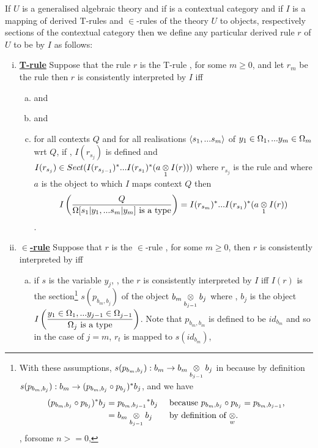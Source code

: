 \begin{definition}
If $U$ is a generalised algebraic theory and if \catcw is a contextual category 
and if $I$ is a  mapping of derived T-rules and $\in$-rules of the theory $U$ to objects, respectively sections of the contextual category \catcw
then we define any particular derived rule $r$ of $U$ to be  by $I$ as follows: \\
\begin{enumerate}[(i)]
\item \underline{\textbf{T-rule}} 
Suppose that  the rule $r$ is the T-rule \ZOmega, for some $m \geq 0$, and let $r_m$ be the rule 
then $r$ is consistently interpreted by $I$ iff
\begin{enumerate}[(a)] 
\item {} and 
\item {} and
\item
for all contexts $Q$ and for all realisations $\tuple{\sm}$ of $\yOmega{m}$ wrt $Q$, 
if \foreachj, $I(r_{s_j})$ is defined 
and $I(r_{s_j}) \in Sect(I(r_{s_{j-1}})^*...I(r_{s_1})^*(\crossx{a}{I(r)}{1}))$
where $r_{s_j}$ is the rule  
and where $a$ is the object to which $I$ maps context $Q$ 
then
$$ \Imappedrule{Q}{\isT{\Omega[\SUBsFORy{m}]}} 
= I(r_{s_m})^*...I(r_{s_1})^*(\crossx{a}{I(r)}{1})$$
. 
\end {enumerate}
\item \underline{\textbf{$\boldsymbol {\in}$-rule}} 
Suppose that $r$ is the $\in$-rule \ZsOmega, for some $m \geq 0$, then
$r$ is consistently interpreted by iff
\begin{enumerate}[(a)]
\item if $s$ is the variable $y_j$, \forsomej, the $r$ is consistently interpreted
by $I$ iff $I(r)$ is the section\footnote{
With these assumptions, $s(p_{b_m,b_j}): b_m \morph \crossx{b_m}{b_j}{b_{j-1}}$ in \catcw because by definition  $s(p_{b_m,b_j}): b_m  \morph (p_{b_m,b_j} \circ p_{b_j})^*b_j$,
and we have 
\begin{align*}
(p_{b_m,b_j} \circ p_{b_j})^*b_j &= {p_{b_m,b_{j-1}}} ^* b_j  && \mbox{ because $p_{b_m,b_j} \circ p_{b_j}=p_{b_m,b_{j-1}}$,} \\
                                 &= \crossx{b_m}{b_j}{b_{j-1}} && \mbox{ by definition of $\crossx{}{}{w}$}.
\end{align*}
, forsome $n >=0$,} %
$s(p_{b_m,b_j})$ of the object $\crossx{b_m}{b_j}{b_{j-1}}$ where \foreachj, $b_j$ is the object
$\displaystyle\Imappedrule{\yOmega{j-1}}{\isT{\Omega_j}}$.  
Note that $p_{b_m,b_m}$ is defined to be $id_{b_m}$ and so in the case of $j=m$, $r_t$
is mapped to   $s(id_{b_m})$,


\end{enumerate}
\end{enumerate}
\end{definition}
